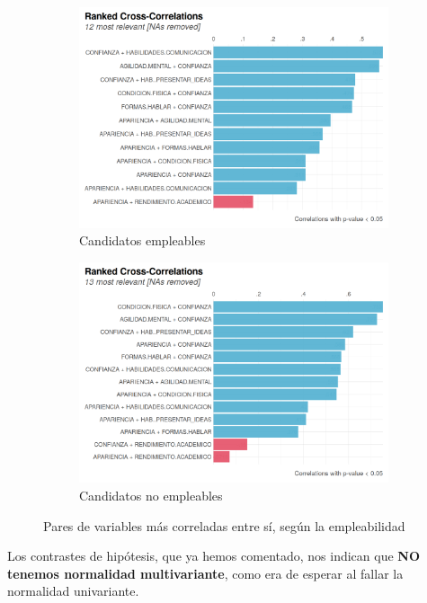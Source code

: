 \documentclass[11pt]{article}
\begin{document}
\begin{figure}[H]
    \centering
    \begin{subfigure}{0.45\textwidth}
        \includegraphics[width=1.0\textwidth]{rank_empleables}
        \caption{Candidatos empleables}
    \end{subfigure}
    \begin{subfigure}{0.45\textwidth}
        \includegraphics[width=1.0\textwidth]{rank_no_empleables}
        \caption{Candidatos no empleables}
    \end{subfigure}

    \caption{Pares de variables más correladas entre sí, según la empleabilidad}
\end{figure}

Los contrastes de hipótesis, que ya hemos comentado, nos indican que \textbf{NO tenemos normalidad multivariante}, como era de esperar al fallar la normalidad univariante.
\end{document}
